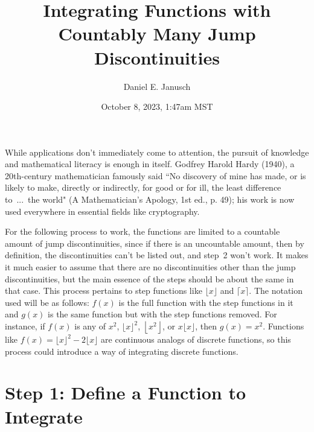 \documentclass[12pt]{article}
\begin{document}
\title{Integrating Functions with Countably Many Jump Discontinuities}
\author{Daniel E. Janusch}
\date{October 8, 2023, 1:47am MST}

\maketitle

	While applications don't immediately come to attention, the pursuit of knowledge and mathematical literacy
	is enough in itself. Godfrey Harold Hardy (1940), a 20th-century mathematician famously said ``No discovery
	of mine has made, or is likely to make, directly or indirectly, for good or for ill, the least difference
	to~...~the world" (A Mathematician's Apology, 1st ed., p. 49); his work is now used everywhere in essential
	fields like cryptography.

	For the following process to work, the functions are limited to a countable amount of jump discontinuities,
	since if there is an uncountable amount, then by definition, the discontinuities can't be listed out, and
	step~2 won't work. It makes it much easier to assume that there are no discontinuities other than the jump
	discontinuities, but the main essence of the steps should be about the same in that case. This process
	pertains to step functions like $\lfloor x\rfloor$ and $\lceil x\rceil$. The notation used will be as
	follows: $f(x)$ is the full function with the step functions in it and  $g(x)$ is the same function but
	with the step functions removed. For instance, if $f(x)$ is any of $x^2$, $\lfloor x\rfloor^2$,
	$\left\lfloor x^2\right\rfloor$, or $x\lfloor x\rfloor$, then $g(x)=x^2$. Functions like
	$f(x)=\lfloor x\rfloor^2-2\lfloor x\rfloor$ are continuous analogs of discrete functions, so this process
	could introduce a way of integrating discrete functions.

\section*{Step 1: Define a Function to Integrate}
\end{document}
